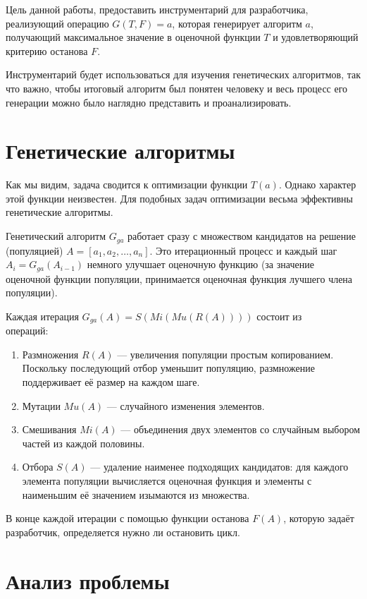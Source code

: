 \documentclass[utf8,a5paper,portrait,10pt]{eskdtext}
\begin{document}
Цель данной работы, предоставить инструментарий для разработчика, реализующий
операцию $G(T, F) = a$, которая генерирует алгоритм $a$, получающий максимальное
значение в оценочной функции $T$ и удовлетворяющий критерию останова $F$.

Инструментарий будет использоваться для изучения генетических алгоритмов, так
что важно, чтобы итоговый алгоритм был понятен человеку и весь процесс его
генерации можно было наглядно представить и проанализировать.

\newpage
\section{Генетические алгоритмы}

Как мы видим, задача сводится к оптимизации функции $T(a)$. Однако характер этой
функции неизвестен. Для подобных задач оптимизации весьма эффективны
генетические алгоритмы.\cite{reinforcement}

Генетический алгоритм $G_{ga}$ работает сразу с множеством кандидатов на решение
(популяцией) $A = [a_1, a_2, …, a_n]$. Это итерационный процесс и каждый шаг
$A_i = G_{ga}(A_{i-1})$ немного улучшает оценочную функцию (за значение
оценочной функции популяции, принимается оценочная функция лучшего члена
популяции).

Каждая итерация $G_{ga}(A) = S(Mi(Mu(R(A))))$ состоит из\\
операций:\cite{reinforcement}
\begin{enumerate}
  \item Размножения $R(A)$ — увеличения популяции простым копированием.
        Поскольку последующий отбор уменьшит популяцию, размножение поддерживает
        её размер на каждом шаге.
  \item Мутации $Mu(A)$ — случайного изменения элементов.
  \item Смешивания $Mi(A)$ — объединения двух элементов со случайным выбором
        частей из каждой половины.
  \item Отбора $S(A)$ — удаление наименее подходящих кандидатов: для каждого
        элемента популяции вычисляется оценочная функция и элементы с
        наименьшим её значением изымаются из множества.
\end{enumerate}

В конце каждой итерации с помощью функции останова $F(A)$, которую задаёт
разработчик, определяется нужно ли остановить цикл.

\newpage
\section{Анализ проблемы}
\end{document}
